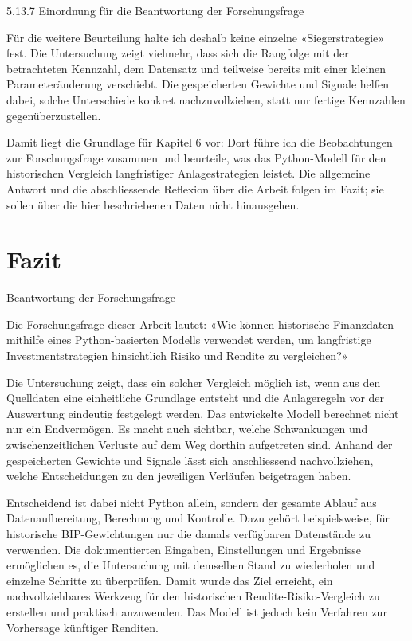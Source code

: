 \documentclass[
  ngerman,
  a4paper,
  DIV=11,
  oneside]{scrreprt}
\begin{document}
5.13.7 Einordnung für die Beantwortung der Forschungsfrage

Für die weitere Beurteilung halte ich deshalb keine einzelne
«Siegerstrategie» fest. Die Untersuchung zeigt vielmehr, dass sich die
Rangfolge mit der betrachteten Kennzahl, dem Datensatz und teilweise
bereits mit einer kleinen Parameteränderung verschiebt. Die
gespeicherten Gewichte und Signale helfen dabei, solche Unterschiede
konkret nachzuvollziehen, statt nur fertige Kennzahlen
gegenüberzustellen.

Damit liegt die Grundlage für Kapitel 6 vor: Dort führe ich die
Beobachtungen zur Forschungsfrage zusammen und beurteile, was das
Python-Modell für den historischen Vergleich langfristiger
Anlagestrategien leistet. Die allgemeine Antwort und die abschliessende
Reflexion über die Arbeit folgen im Fazit; sie sollen über die hier
beschriebenen Daten nicht hinausgehen.


\chapter{Fazit}\label{fazit}

Beantwortung der Forschungsfrage

Die Forschungsfrage dieser Arbeit lautet: «Wie können historische
Finanzdaten mithilfe eines Python-basierten Modells verwendet werden, um
langfristige Investmentstrategien hinsichtlich Risiko und Rendite zu
vergleichen?»

Die Untersuchung zeigt, dass ein solcher Vergleich möglich ist, wenn aus
den Quelldaten eine einheitliche Grundlage entsteht und die Anlageregeln
vor der Auswertung eindeutig festgelegt werden. Das entwickelte Modell
berechnet nicht nur ein Endvermögen. Es macht auch sichtbar, welche
Schwankungen und zwischenzeitlichen Verluste auf dem Weg dorthin
aufgetreten sind. Anhand der gespeicherten Gewichte und Signale lässt
sich anschliessend nachvollziehen, welche Entscheidungen zu den
jeweiligen Verläufen beigetragen haben.

Entscheidend ist dabei nicht Python allein, sondern der gesamte Ablauf
aus Datenaufbereitung, Berechnung und Kontrolle. Dazu gehört
beispielsweise, für historische BIP-Gewichtungen nur die damals
verfügbaren Datenstände zu verwenden. Die dokumentierten Eingaben,
Einstellungen und Ergebnisse ermöglichen es, die Untersuchung mit
demselben Stand zu wiederholen und einzelne Schritte zu überprüfen.
Damit wurde das Ziel erreicht, ein nachvollziehbares Werkzeug für den
historischen Rendite-Risiko-Vergleich zu erstellen und praktisch
anzuwenden. Das Modell ist jedoch kein Verfahren zur Vorhersage
künftiger Renditen.
\end{document}
